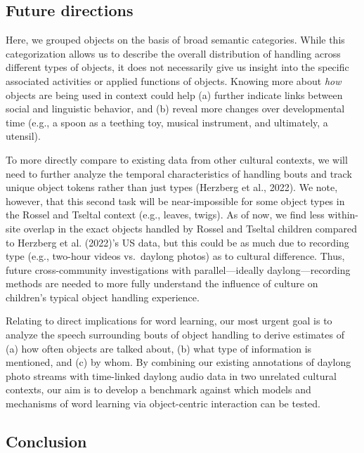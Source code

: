 \documentclass[10pt, letterpaper]{article}
\begin{document}
\hypertarget{future-directions}{%
\subsection{Future directions}\label{future-directions}}

Here, we grouped objects on the basis of broad semantic categories.
While this categorization allows us to describe the overall distribution
of handling across different types of objects, it does not necessarily
give us insight into the specific associated activities or applied
functions of objects. Knowing more about \emph{how} objects are being
used in context could help (a) further indicate links between social and
linguistic behavior, and (b) reveal more changes over developmental time
(e.g., a spoon as a teething toy, musical instrument, and ultimately, a
utensil).

To more directly compare to existing data from other cultural contexts,
we will need to further analyze the temporal characteristics of handling
bouts and track unique object tokens rather than just types (Herzberg et
al., 2022). We note, however, that this second task will be
near-impossible for some object types in the Rossel and Tseltal context
(e.g., leaves, twigs). As of now, we find less within-site overlap in
the exact objects handled by Rossel and Tseltal children compared to
Herzberg et al. (2022)'s US data, but this could be as much due to
recording type (e.g., two-hour videos vs.~daylong photos) as to cultural
difference. Thus, future cross-community investigations with
parallel---ideally daylong---recording methods are needed to more fully
understand the influence of culture on children's typical object
handling experience.

Relating to direct implications for word learning, our most urgent goal
is to analyze the speech surrounding bouts of object handling to derive
estimates of (a) how often objects are talked about, (b) what type of
information is mentioned, and (c) by whom. By combining our existing
annotations of daylong photo streams with time-linked daylong audio data
in two unrelated cultural contexts, our aim is to develop a benchmark
against which models and mechanisms of word learning via object-centric
interaction can be tested.

\hypertarget{conclusion}{%
\subsection{Conclusion}\label{conclusion}}
\end{document}
